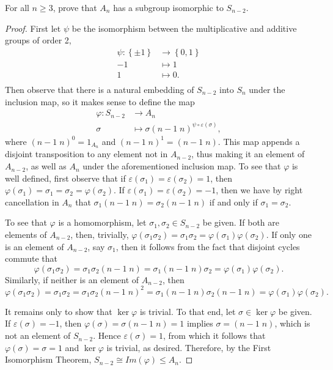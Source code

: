 \documentclass[10pt]{amsart}
\begin{document}
\begin{ex3}
  For all $n \geq 3$, prove that $A_n$ has a subgroup isomorphic to $S_{n-2}$.
  \begin{proof}
    First let $\psi$ be the isomorphism between the multiplicative and additive groups of order 2,
    \begin{align*}
      \psi \colon \left\{\pm 1\right\} & \rightarrow \left\{0,1\right\}\\
        -1 & \mapsto 1\\
        1 & \mapsto 0.\\
    \end{align*}
    Then observe that there is a natural embedding of $S_{n-2}$ into $S_n$ under the inclusion map, so it makes sense to define the map 
    \begin{align*}
      \varphi \colon S_{n-2} & \rightarrow A_n\\
      \sigma & \mapsto \sigma \left( n-1\; n \right)^{\psi\circ\varepsilon(\sigma)},
    \end{align*}
    where $(n-1\; n)^{0} = 1_{A_n}$ and $(n-1\; n)^1 = (n-1\; n)$.
    This map appends a disjoint transposition to any element not in $A_{n-2}$, thus making it an element of $A_{n-2}$, as well as $A_n$ under the aforementioned inclusion map.
    To see that $\varphi$ is well defined, first observe that if $\varepsilon(\sigma_1) = \varepsilon(\sigma_2) = 1$, then $\varphi(\sigma_1) = \sigma_1 = \sigma_2 = \varphi(\sigma_2)$.
    If $\varepsilon(\sigma_1) = \varepsilon(\sigma_2) = -1$, then  we have by right cancellation in $A_n$ that $\sigma_1(n-1\; n) = \sigma_2(n-1\; n)$ if and only if $\sigma_1 = \sigma_2$.

    To see that $\varphi$ is a homomorphism, let $\sigma_1, \sigma_2 \in S_{n-2}$ be given.
    If both are elements of $A_{n-2}$, then, trivially, $\varphi(\sigma_1\sigma_2) = \sigma_1\sigma_2 = \varphi(\sigma_1)\varphi(\sigma_2)$.
    If only one is an element of $A_{n-2}$, say $\sigma_1$, then it follows from the fact that disjoint cycles commute that
    $$\varphi(\sigma_1\sigma_2) = \sigma_1\sigma_2(n-1\; n) = \sigma_1(n-1\; n)\sigma_2 = \varphi(\sigma_1)\varphi(\sigma_2).$$
    Similarly, if neither is an element of $A_{n-2}$, then
    $$\varphi(\sigma_1\sigma_2) = \sigma_1\sigma_2 = \sigma_1\sigma_2(n-1\; n)^2 = \sigma_1(n-1\; n)\sigma_2(n-1\; n) = \varphi(\sigma_1)\varphi(\sigma_2).$$
    
    It remains only to show that $\ker\varphi$ is trivial.  
    To that end, let $\sigma \in \ker\varphi$ be given.
    If $\varepsilon(\sigma) = -1$, then $\varphi(\sigma) = \sigma(n-1\; n) = 1$ implies $\sigma = (n-1\; n)$, which is not an element of $S_{n-2}$.
    Hence $\varepsilon(\sigma) = 1$, from which it follows that $\varphi(\sigma) = \sigma = 1$ and $\ker\varphi$ is trivial, as desired.
    Therefore, by the First Isomorphism Theorem, $S_{n-2} \cong Im(\varphi) \leq A_n$.
    
  \end{proof}
\end{ex3}
\end{document}
